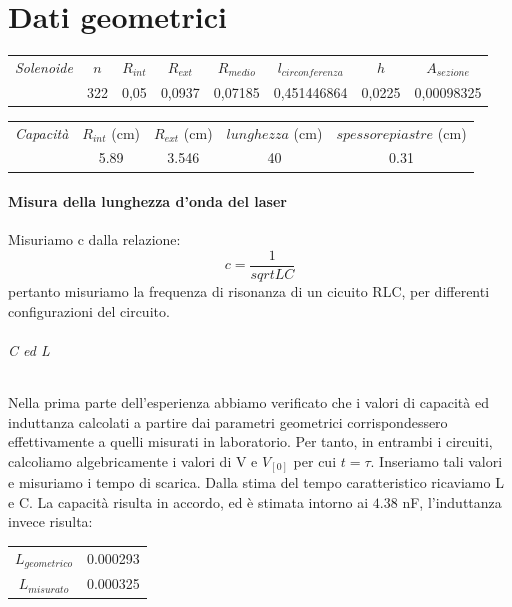 

\chapter{Dati geometrici}
\begin{center}
\begin{tabular}{|c|c|c|c|c|c|c|c|}
\midrule
\textit{Solenoide} & $n$ & $R_{int}$ & $R_{ext}$ & $R_{medio}$ & $l_{circonferenza}$ & $h$ & $A_{sezione}$  \\
		   & 322 & 0,05	 & 0,0937  & 0,07185 & 0,451446864 & 0,0225 &	0,00098325 \\
 \midrule
\end{tabular}
\end{center}


\begin{center}
\begin{tabular}{|c|c|c|c|c|}
\midrule
\textit{Capacità} & $R_{int}$ (cm) & $R_{ext}$ (cm) & $lunghezza$ (cm) & $spessore piastre$ (cm)\\
   & 5.89 & 3.546  & 40  & 0.31 \\
 \midrule
\end{tabular}
\end{center}

\subsubsection{Misura della lunghezza d'onda del laser}

Misuriamo c dalla relazione:
\begin{equation}
 c=\frac{1}{sqrt{LC}}
\end{equation}
pertanto misuriamo la frequenza di risonanza di un cicuito RLC, per differenti configurazioni del circuito.

\subparagraph*{C ed L}
Nella prima parte dell'esperienza abbiamo verificato che i valori di capacità ed induttanza calcolati a partire dai parametri geometrici corrispondessero effettivamente a quelli misurati in laboratorio. 
Per tanto, in entrambi i circuiti, calcoliamo algebricamente i valori di V e $V_[0]$ per cui $t = \tau$. Inseriamo tali valori e misuriamo i tempo di scarica. Dalla stima del tempo caratteristico ricaviamo L e C. La capacità risulta in accordo, ed è stimata intorno ai $4.38$ nF, l'induttanza invece risulta:

\begin{center}
\begin{tabular}{c c}
$L_{geometrico}$  & 0.000293\\
$L_{misurato}$ & 0.000325\\
\end{tabular}
\end{center}


